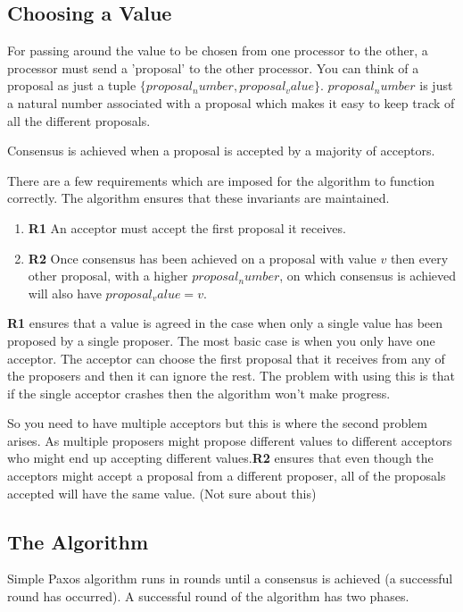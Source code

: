 \subsection{Choosing a Value}
For passing around the value to be chosen from one processor to the other,
a processor must send a 'proposal' to the other processor.
You can think of a proposal as just a tuple $\lbrace proposal_number, proposal_value \rbrace$.
$proposal_number$ is just a natural number associated with a proposal which makes
it easy to keep track of all the different proposals.

Consensus is achieved when a proposal is accepted by a majority of acceptors.

There are a few requirements which are imposed for the algorithm to function correctly.
The algorithm ensures that these invariants are maintained.
\begin{enumerate}
  \item \textbf{R1} An acceptor must accept the first proposal it receives.
  \item \textbf{R2} Once consensus has been achieved on a proposal with value $v$
    then every other proposal, with a higher $proposal_number$, on which consensus
    is achieved will also have $proposal_value = v$.
\end{enumerate}

\textbf{R1} ensures that a value is agreed in the case when only a single value
has been proposed by a single proposer. The most basic case is when you only have
one acceptor. The acceptor can choose the first proposal that it receives from
any of the proposers and then it can ignore the rest. The problem with using
this is that if the single acceptor crashes then the algorithm won't make progress.

So you need to have multiple acceptors but this is where the second problem arises.
As multiple proposers might propose different values to different acceptors who
might end up accepting different values.\textbf{R2} ensures that even though the
acceptors might accept a proposal from a different proposer, all of the
proposals accepted will have the same value. (Not sure about this)

\subsection{The Algorithm}
Simple Paxos algorithm runs in rounds until a consensus is achieved
(a successful round has occurred). A successful round of the algorithm has two phases.

